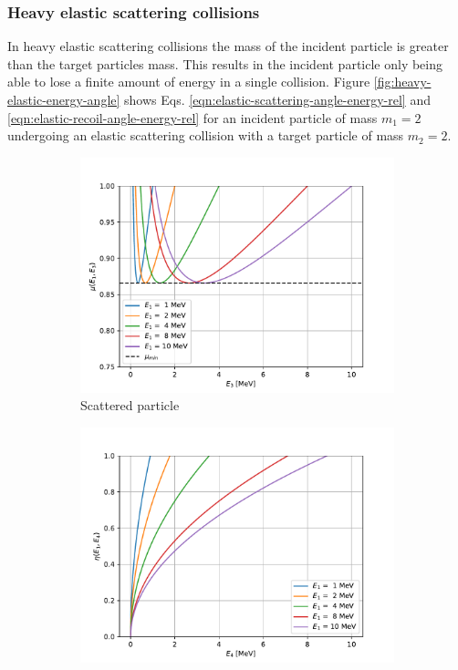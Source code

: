 \documentclass[../main.tex]{subfiles}
\begin{document}
\subsubsection{Heavy elastic scattering collisions}
In heavy elastic scattering collisions the mass of the incident particle is greater than the target particles mass. This results in the incident particle only being able to lose a finite amount of energy in a single collision. Figure \ref{fig:heavy-elastic-energy-angle} shows Eqs. \eqref{eqn:elastic-scattering-angle-energy-rel}  and \eqref{eqn:elastic-recoil-angle-energy-rel} for an incident particle of mass $m_1 = 2$ undergoing an elastic scattering collision with a target particle of mass $m_2 = 2$. 
\begin{figure}[!htb]
  \centering
  \begin{subfigure}{.5\textwidth}
    \centering
    \includegraphics[width=\linewidth]{../figures/particle_kinematics/heavy_energy_angle.pdf}
    \caption{Scattered particle}
    \label{fig:heavy-elastic-energy-angle-scattered}
  \end{subfigure}%
  \begin{subfigure}{.5\textwidth}
    \centering
    \includegraphics[width=\linewidth]{../figures/particle_kinematics/heavy_recoil_energy_angle.pdf}

\end{subfigure}
\end{figure}
\end{document}
